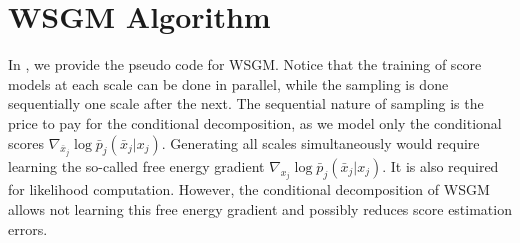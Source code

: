 \documentclass{article}
\begin{document}
\section{WSGM Algorithm}
\label{sec:wsgm-pseudocode}

In , we provide the pseudo code for WSGM. Notice that the training of score models at each scale can be done in parallel, while the sampling is done sequentially one scale after the next. The sequential nature of sampling is the price to pay for the conditional decomposition, as we model only the conditional scores $\nabla_{\bar x_j} \log \bar p_j(\bar x_j | x_j)$. Generating all scales simultaneously would require learning the so-called free energy gradient $\nabla_{x_j} \log \bar p_j(\bar x_j | x_j)$. It is also required for likelihood computation. However, the conditional decomposition of WSGM allows not learning this free energy gradient and possibly reduces score estimation errors.

\end{document}
